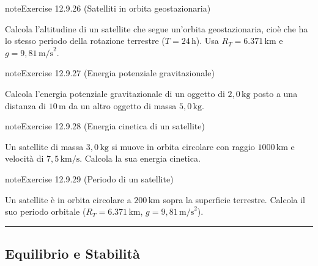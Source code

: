 \documentclass[letterpaper,10pt,italian]{jupyterBook}
\begin{document}
\begin{sphinxadmonition}{note}{Exercise 12.9.26 (Satelliti in orbita geostazionaria)}



\sphinxAtStartPar
Calcola l’altitudine di un satellite che segue un’orbita geostazionaria, cioè che ha lo stesso periodo della rotazione terrestre (\(T = 24 \, \text{h}\)). Usa \(R_T = 6.371 \, \text{km}\) e \(g = 9,81 \, \text{m/s}^2\).
\end{sphinxadmonition}
 \label{exercise:ch/mechanics/dynamics-problems-exercise-26}

\begin{sphinxadmonition}{note}{Exercise 12.9.27 (Energia potenziale gravitazionale)}



\sphinxAtStartPar
Calcola l’energia potenziale gravitazionale di un oggetto di \(2,0 \, \text{kg}\) posto a una distanza di \(10 \, \text{m}\) da un altro oggetto di massa \(5,0 \, \text{kg}\).
\end{sphinxadmonition}
 \label{exercise:ch/mechanics/dynamics-problems-exercise-27}

\begin{sphinxadmonition}{note}{Exercise 12.9.28 (Energia cinetica di un satellite)}



\sphinxAtStartPar
Un satellite di massa \(3,0 \, \text{kg}\) si muove in orbita circolare con raggio \(1000 \, \text{km}\) e velocità di \(7,5 \, \text{km/s}\). Calcola la sua energia cinetica.
\end{sphinxadmonition}
 \label{exercise:ch/mechanics/dynamics-problems-exercise-28}

\begin{sphinxadmonition}{note}{Exercise 12.9.29 (Periodo di un satellite)}



\sphinxAtStartPar
Un satellite è in orbita circolare a \(200 \, \text{km}\) sopra la superficie terrestre. Calcola il suo periodo orbitale (\(R_T = 6.371 \, \text{km}\), \(g = 9,81 \, \text{m/s}^2\)).
\end{sphinxadmonition}


\bigskip\hrule\bigskip



\subsection{Equilibrio e Stabilità}
\label{\detokenize{ch/mechanics/dynamics-problems:equilibrio-e-stabilita}} \label{exercise:ch/mechanics/dynamics-problems-exercise-29}
\end{document}
